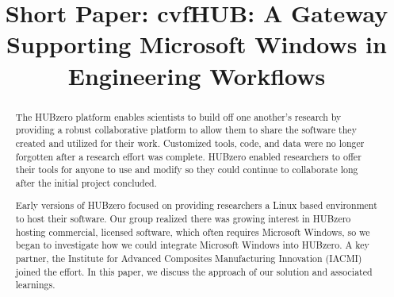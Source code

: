 \documentclass[conference]{../sty/IEEEtran}
\begin{document}
%
\title{Short Paper: cvfHUB: A Gateway Supporting Microsoft Windows in Engineering Workflows}


\author{
\and
\author{
}


\maketitle

\begin{abstract}

The HUBzero\textsuperscript{\textregistered} platform enables scientists to build off one another’s research by providing a robust collaborative platform to allow them to share the software they created and utilized for their work. Customized tools, code, and data were no longer forgotten after a research effort was complete. HUBzero enabled researchers to offer their tools for anyone to use and modify so they could continue to collaborate long after the initial project concluded.

Early versions of HUBzero focused on providing researchers a Linux based environment to host their software. Our group realized there was growing interest in HUBzero hosting commercial, licensed software, which often requires Microsoft Windows, so we began to investigate how we could integrate Microsoft Windows into HUBzero.  A key partner, the Institute for Advanced Composites Manufacturing Innovation (IACMI) joined the effort.  In this paper, we discuss the approach of our solution and associated learnings.


\end{abstract}}
\end{document}
